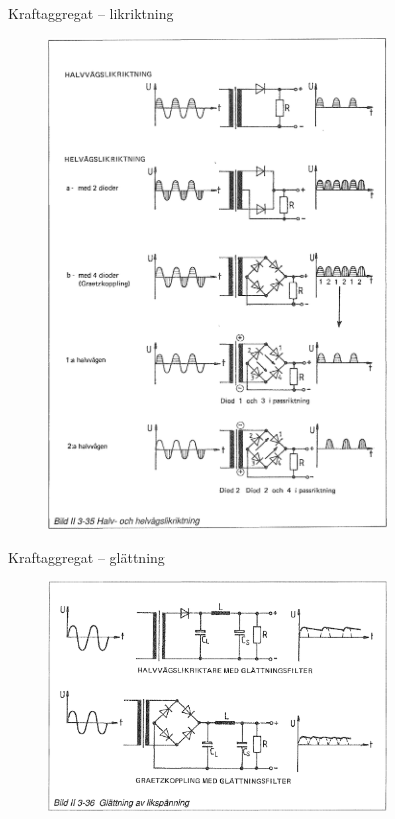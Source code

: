 \documentclass{beamer}
\begin{document}
\begin{frame}{Kraftaggregat -- likriktning}

\begin{figure}[h]
\includegraphics[width=0.8\textwidth]{images/bild_2_3-35}
\label{fig:BildII1-16}
\end{figure}
\end{frame}

\begin{frame}{Kraftaggregat -- glättning}

\begin{figure}[h]
\includegraphics[width=0.8\textwidth]{images/bild_2_3-36}
\label{fig:BildII1-16}
\end{figure}
\end{frame}
\end{document}
